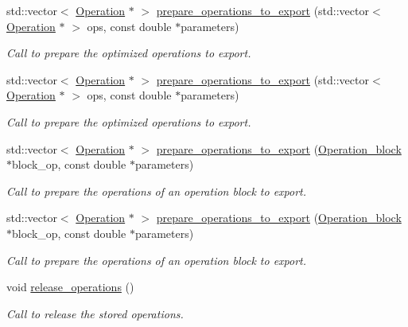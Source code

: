 \begin{DoxyCompactItemize}
std\+::vector$<$ \hyperlink{class_operation}{Operation} $\ast$ $>$ \hyperlink{class_decomposition___base_a3efce739eaf575d284156813436bb469}{prepare\+\_\+operations\+\_\+to\+\_\+export} (std\+::vector$<$ \hyperlink{class_operation}{Operation} $\ast$ $>$ ops, const double $\ast$parameters)
\begin{DoxyCompactList}\small\item\em Call to prepare the optimized operations to export. \end{DoxyCompactList}\item 
std\+::vector$<$ \hyperlink{class_operation}{Operation} $\ast$ $>$ \hyperlink{class_decomposition___base_a68dcc2cdfa644cf8043021367cc07d28}{prepare\+\_\+operations\+\_\+to\+\_\+export} (std\+::vector$<$ \hyperlink{class_operation}{Operation} $\ast$ $>$ ops, const double $\ast$parameters)
\begin{DoxyCompactList}\small\item\em Call to prepare the optimized operations to export. \end{DoxyCompactList}\item 
std\+::vector$<$ \hyperlink{class_operation}{Operation} $\ast$ $>$ \hyperlink{class_decomposition___base_a267addf036c4207905f7f443aea471bb}{prepare\+\_\+operations\+\_\+to\+\_\+export} (\hyperlink{class_operation__block}{Operation\+\_\+block} $\ast$block\+\_\+op, const double $\ast$parameters)
\begin{DoxyCompactList}\small\item\em Call to prepare the operations of an operation block to export. \end{DoxyCompactList}\item 
std\+::vector$<$ \hyperlink{class_operation}{Operation} $\ast$ $>$ \hyperlink{class_decomposition___base_a9d4cf31a7409fcc6a74d6ed927839f15}{prepare\+\_\+operations\+\_\+to\+\_\+export} (\hyperlink{class_operation__block}{Operation\+\_\+block} $\ast$block\+\_\+op, const double $\ast$parameters)
\begin{DoxyCompactList}\small\item\em Call to prepare the operations of an operation block to export. \end{DoxyCompactList}\item 
void \hyperlink{class_operation__block_a7c3d4eadaef2f21f1c5dd9227faec7ce}{release\+\_\+operations} ()
\begin{DoxyCompactList}\small\item\em Call to release the stored operations. \end{DoxyCompactList}\item 

\end{DoxyCompactItemize}

